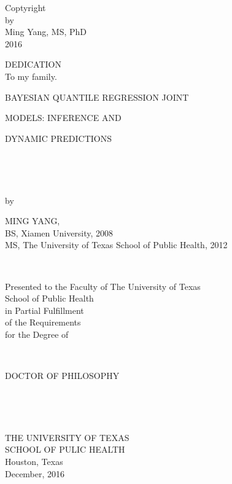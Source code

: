 \thispagestyle{empty}


\newpage
\thispagestyle{empty}
\begin{center}
\singlespacing
Coptyright\\
by\\
Ming Yang, MS, PhD\\
2016
\end{center}


\newpage
\thispagestyle{empty}
\doublespacing
\begin{center}
DEDICATION\\
To my family.\\
\end{center}


\newpage
\thispagestyle{empty}
\doublespacing
\begin{center}

{\normalsize  BAYESIAN QUANTILE REGRESSION JOINT\par
MODELS: INFERENCE AND\par
DYNAMIC PREDICTIONS}

\ \par
\ \par
by\par
\singlespacing
MING YANG, \\
BS, Xiamen University, 2008\\
MS, The University of Texas School of Public Health, 2012\par

\ \par
\doublespacing
Presented to the Faculty of The University of Texas\\
School of Public Health\\
in Partial Fulfillment\\
of the Requirements\\
for the Degree of\par
\ \par
DOCTOR OF PHILOSOPHY\par
\ \par
\ \par
\singlespacing
THE UNIVERSITY OF TEXAS\\
SCHOOL OF PULIC HEALTH\\
Houston, Texas\\
December, 2016
\end{center}


